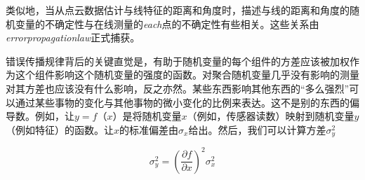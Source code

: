 

类似地，当从点云数据估计与线特征的距离和角度时，描述与线的距离和角度的随机变量的不确定性与在线测量的\emph{each}点的不确定性有些相关。这些关系由\emph{errorpropagationlaw}正式捕获。

错误传播规律背后的关键直觉是，有助于随机变量的每个组件的方差应该被加权作为这个组件影响这个随机变量的强度的函数。对聚合随机变量几乎没有影响的测量对其方差也应该没有什么影响，反之亦然。某些东西影响其他东西的“多么强烈”可以通过某些事物的变化与其他事物的微小变化的比例来表达。这不是别的东西的偏导数。例如，让$y=f（x）$是将随机变量$x$（例如，传感器读数）映射到随机变量$y$（例如特征）的函数。让$x$的标准偏差由$\sigma_x$给出。然后，我们可以计算方差$\sigma_y^2$


\begin{equation}
\sigma_y^2=\left(\frac{\partial f}{\partial x}\right)^2 \sigma_x^2
\end{equation}


